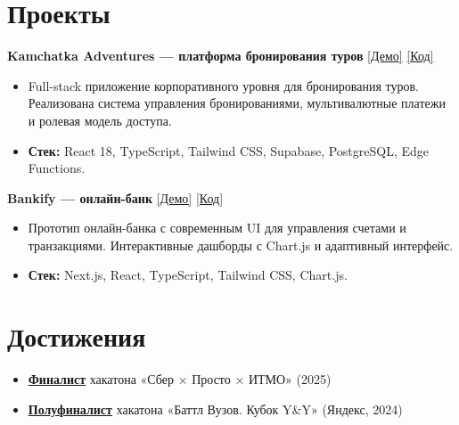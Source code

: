 \documentclass[a4paper,11pt]{article}
\begin{document}
\section*{Проекты}
\noindent\textbf{Kamchatka Adventures — платформа бронирования туров} \hfill \href{https://kamchatka-adventures.vercel.app/}{[Демо]} \quad \href{https://github.com/Jimike110/Kamchatka/}{[Код]} \\
\begin{itemize}[leftmargin=*, topsep=0.5ex, itemsep=0.2ex]
    \item Full-stack приложение корпоративного уровня для бронирования туров. Реализована система управления бронированиями, мультивалютные платежи и ролевая модель доступа.
    \item \textbf{Стек:} React 18, TypeScript, Tailwind CSS, Supabase, PostgreSQL, Edge Functions.
\end{itemize}
\vspace{1ex}

\noindent\textbf{Bankify — онлайн-банк} \hfill \href{https://bankify-jimike.vercel.app/}{[Демо]} \quad \href{https://github.com/Jimike110/bankify}{[Код]} \\
\begin{itemize}[leftmargin=*, topsep=0.5ex, itemsep=0.2ex]
    \item Прототип онлайн-банка с современным UI для управления счетами и транзакциями.  
    Интерактивные дашборды с Chart.js и адаптивный интерфейс.
    \item \textbf{Стек:} Next.js, React, TypeScript, Tailwind CSS, Chart.js.
\end{itemize}


\section*{Достижения}
\begin{itemize}[leftmargin=*, topsep=0.5ex, itemsep=0.2ex]
    \item \href{https://disk.yandex.ru/i/wE10Gv0LYPanjg}{\textbf{Финалист}} хакатона «Сбер × Просто × ИТМО» (2025)
    \item \href{https://certify.s3.yandex.net/young-yandex/74b6021d-3100-422c-b4d4-0a0d8d1833ea/4df33b64-d63d-402a-92cb-dd5955e80ff3.pdf}{\textbf{Полуфиналист}} хакатона «Баттл Вузов. Кубок Y\&Y» (Яндекс, 2024)
\end{itemize}
\end{document}

